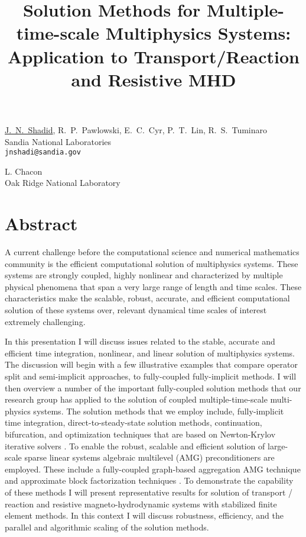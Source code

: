 \title{Solution Methods for Multiple-time-scale Multiphysics Systems: Application to Transport/Reaction and Resistive MHD}
\author{} \institute{}
\maketitle

\begin{center}
{\large \underline{J.~N.~Shadid}, R.~P.~Pawlowski, E.~C.~Cyr, P.~T.~Lin, R.~S.~Tuminaro}\\
Sandia National Laboratories\\
{\tt jnshadi@sandia.gov}\\
\vspace{4mm}

{\large L. Chacon}\\
Oak Ridge National Laboratory
\end{center}

\section*{Abstract}
A current challenge before the computational science and numerical mathematics community is the efficient computational solution of multiphysics systems.  These systems are strongly coupled, highly nonlinear and characterized by multiple physical phenomena that span a very large range of length and time scales.   These characteristics make the scalable, robust, accurate, and efficient computational solution of these systems over, relevant dynamical time scales of interest extremely challenging.

In this presentation I will discuss issues related to the stable, accurate and efficient time integration, nonlinear, and linear solution of multiphysics systems. The discussion will begin with a few illustrative examples that compare operator split and semi-implicit approaches, to fully-coupled fully-implicit methods. I will then overview a number of the important fully-coupled solution methods that our research group has applied to the solution of coupled multiple-time-scale multi-physics systems. The solution methods that we employ include, fully-implicit time integration, direct-to-steady-state solution methods, continuation, bifurcation, and optimization techniques that are based on Newton-Krylov iterative solvers \cite{shadid1,shadid2}. To enable the robust, scalable and efficient solution of large-scale sparse  linear systems algebraic multilevel (AMG) preconditioners are employed. These include a fully-coupled graph-based aggregation AMG technique \cite{shadid3} and approximate block factorization techniques \cite{shadid4}. To demonstrate the capability of these methods I will present representative results for solution of transport / reaction and resistive 
magneto-hydrodynamic systems with stabilized finite element methods. In this context I will discuss robustness, efficiency, and the parallel and algorithmic scaling of the solution methods.

